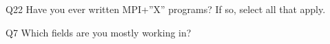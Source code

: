 \begin{description}%
\item{Q22} Have you ever written MPI+”X” programs? If so, select all that apply.%
\item{Q7} Which fields are you mostly working in?%
\end{description}%
